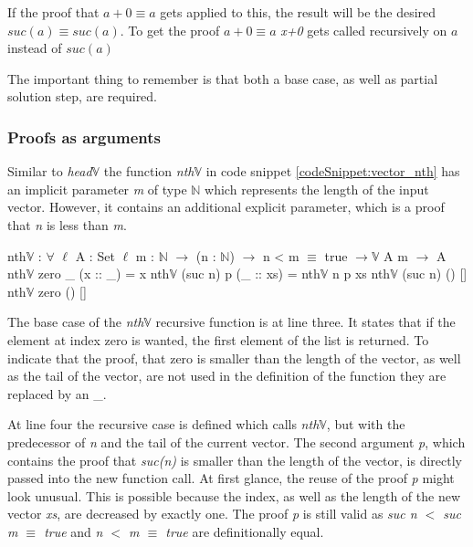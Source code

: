 If the proof that $a + 0 \equiv a$ gets applied to this, the result will be the desired $suc(a) \equiv suc(a)$. 
To get the proof $a + 0 \equiv a$ \emph{x+0} gets called recursively on $a$ instead of $suc(a)$

The important thing to remember is that both a base case, as well as partial solution step, are required.

\subsubsection{Proofs as arguments}

Similar to \emph{head$\mathbb{V}$} the function \emph{nth$\mathbb{V}$} in code snippet \ref{codeSnippet:vector_nth} has an implicit parameter \emph{m} of type $\mathbb{N}$ which represents the length of the input vector. 
However, it contains an additional explicit parameter, which is a proof that \emph{n} is less than \emph{m}.

\begin{codesnippet}[mathescape=true, caption={Definition of \emph{nth} function in Agda}, label={codeSnippet:vector_nth}]
nth$\mathbb{V}$ : $\forall$ {$\ell$} {A : Set $\ell$} {m : $\mathbb{N}$} $\rightarrow$
       (n : $\mathbb{N}$) $\rightarrow$ n < m $\equiv$ true $\rightarrow \mathbb{V}$ A m $\rightarrow$ A
nth$\mathbb{V}$ zero _ (x :: _) = x
nth$\mathbb{V}$ (suc n) p (_ :: xs) = nth$\mathbb{V}$ n p xs
nth$\mathbb{V}$ (suc n) () []
nth$\mathbb{V}$ zero () []
\end{codesnippet}

The base case of the \emph{nth$\mathbb{V}$} recursive function is at line three. It states that if the element at index zero is wanted, the first element of the list is returned.
To indicate that the proof, that zero is smaller than the length of the vector, as well as the tail of the vector, are not used in the definition of the function they are replaced by an \_.

At line four the recursive case is defined which calls \emph{nth$\mathbb{V}$}, but with the predecessor of \emph{n} and the tail of the current vector.
The second argument \emph{p}, which contains the proof that \emph{suc(n)} is smaller than the length of the vector, is directly passed into the new function call. 
At first glance, the reuse of the proof \emph{p} might look unusual. 
This is possible because the index, as well as the length of the new vector \emph{xs}, are decreased by exactly one.
The proof \emph{p} is still valid as \emph{suc n $<$ suc m $\equiv$ true} and \emph{n $<$ m $\equiv$ true} are definitionally equal.

